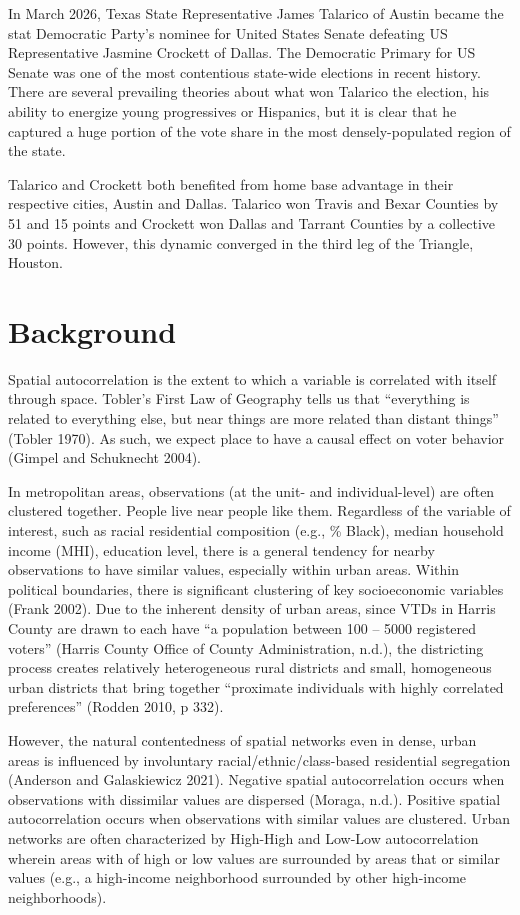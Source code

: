 \documentclass[
]{article}
\begin{document}
In March 2026, Texas State Representative James Talarico of Austin
became the stat Democratic Party's nominee for United States Senate
defeating US Representative Jasmine Crockett of Dallas. The Democratic
Primary for US Senate was one of the most contentious state-wide
elections in recent history. There are several prevailing theories about
what won Talarico the election, his ability to energize young
progressives or Hispanics, but it is clear that he captured a huge
portion of the vote share in the most densely-populated region of the
state.

Talarico and Crockett both benefited from home base advantage in their
respective cities, Austin and Dallas. Talarico won Travis and Bexar
Counties by 51 and 15 points and Crockett won Dallas and Tarrant
Counties by a collective 30 points. However, this dynamic converged in
the third leg of the Triangle, Houston.

\section{Background}\label{background}

Spatial autocorrelation is the extent to which a variable is correlated
with itself through space. Tobler's First Law of Geography tells us that
``everything is related to everything else, but near things are more
related than distant things'' (Tobler 1970). As such, we expect place to
have a causal effect on voter behavior (Gimpel and Schuknecht 2004).

In metropolitan areas, observations (at the unit- and individual-level)
are often clustered together. People live near people like them.
Regardless of the variable of interest, such as racial residential
composition (e.g., \% Black), median household income (MHI), education
level, there is a general tendency for nearby observations to have
similar values, especially within urban areas. Within political
boundaries, there is significant clustering of key socioeconomic
variables (Frank 2002). Due to the inherent density of urban areas,
since VTDs in Harris County are drawn to each have ``a population
between 100 -- 5000 registered voters'' (Harris County Office of County
Administration, n.d.), the districting process creates relatively
heterogeneous rural districts and small, homogeneous urban districts
that bring together ``proximate individuals with highly correlated
preferences'' (Rodden 2010, p 332).

However, the natural contentedness of spatial networks even in dense,
urban areas is influenced by involuntary racial/ethnic/class-based
residential segregation (Anderson and Galaskiewicz 2021). Negative
spatial autocorrelation occurs when observations with dissimilar values
are dispersed (Moraga, n.d.). Positive spatial autocorrelation occurs
when observations with similar values are clustered. Urban networks are
often characterized by High-High and Low-Low autocorrelation wherein
areas with of high or low values are surrounded by areas that or similar
values (e.g., a high-income neighborhood surrounded by other high-income
neighborhoods).
\end{document}
